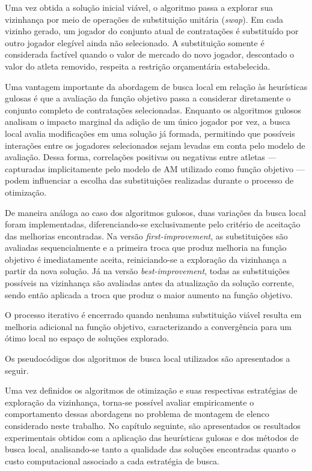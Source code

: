 Uma vez obtida a solução inicial viável, o algoritmo passa a explorar sua vizinhança por meio de operações de substituição unitária (\textit{swap}). 
Em cada vizinho gerado, um jogador do conjunto atual de contratações é substituído por outro jogador elegível ainda não selecionado. A substituição 
somente é considerada factível quando o valor de mercado do novo jogador, descontado o valor do atleta removido, respeita a restrição orçamentária estabelecida.

Uma vantagem importante da abordagem de busca local em relação às heurísticas gulosas é que a avaliação da função objetivo passa a considerar diretamente 
o conjunto completo de contratações selecionadas. Enquanto os algoritmos gulosos analisam o impacto marginal da adição de um único jogador por vez, 
a busca local avalia modificações em uma solução já formada, permitindo que possíveis interações entre os jogadores selecionados sejam levadas em 
conta pelo modelo de avaliação. Dessa forma, correlações positivas ou negativas entre atletas — capturadas implicitamente pelo modelo de AM 
utilizado como função objetivo — podem influenciar a escolha das substituições realizadas durante o processo de otimização.

De maneira análoga ao caso dos algoritmos gulosos, duas variações da busca local foram implementadas, diferenciando-se exclusivamente pelo 
critério de aceitação das melhorias encontradas. Na versão \textit{first-improvement}, as substituições são avaliadas sequencialmente e a primeira 
troca que produz melhoria na função objetivo é imediatamente aceita, reiniciando-se a exploração da vizinhança a partir da nova solução. 
Já na versão \textit{best-improvement}, todas as substituições possíveis na vizinhança são avaliadas antes da atualização da solução corrente, 
sendo então aplicada a troca que produz o maior aumento na função objetivo.

O processo iterativo é encerrado quando nenhuma substituição viável resulta em melhoria adicional na função objetivo, caracterizando a 
convergência para um ótimo local no espaço de soluções explorado.

Os pseudocódigos dos algoritmos de busca local utilizados são apresentados a seguir.



\FloatBarrier

Uma vez definidos os algoritmos de otimização e suas respectivas estratégias de exploração da vizinhança, torna-se possível avaliar empiricamente 
o comportamento dessas abordagens no problema de montagem de elenco considerado neste trabalho. No capítulo seguinte, são apresentados os resultados experimentais 
obtidos com a aplicação das heurísticas gulosas e dos métodos de busca local, analisando-se tanto a qualidade das soluções encontradas quanto o custo computacional 
associado a cada estratégia de busca.